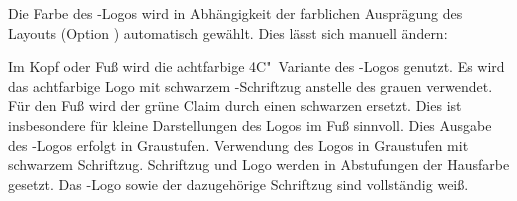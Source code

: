 \begin{DeclareEntity*}{}
\begin{DeclareEntity*}{}
\begin{DeclareEntity*}{}
\begin{Declaration}
\begin{Declaration}
\begin{Declaration}
Die Farbe des \DDC-Logos wird in Abhängigkeit der farblichen Ausprägung des 
Layouts (Option ) automatisch gewählt. Dies lässt sich 
manuell ändern:
\begin{DeclareValues}
  Im Kopf oder Fuß wird die achtfarbige 4C"~Variante des \DDC-Logos genutzt.
  Es wird das achtfarbige Logo mit schwarzem \DDC-Schriftzug anstelle des 
  grauen verwendet. Für den Fuß wird der grüne Claim durch einen schwarzen 
  ersetzt. Dies ist insbesondere für kleine Darstellungen des Logos im Fuß 
  sinnvoll.
  Dies Ausgabe des \DDC-Logos erfolgt in Graustufen.
  Verwendung des Logos in Graustufen mit schwarzem Schriftzug.
  Schriftzug und Logo werden in Abstufungen der Hausfarbe  gesetzt.
  Das \DDC-Logo sowie der dazugehörige Schriftzug sind vollständig weiß.
\end{DeclareValues}
\end{Declaration}
\end{Declaration}
\end{Declaration}


\end{DeclareEntity*}
\end{DeclareEntity*}
\end{DeclareEntity*}
